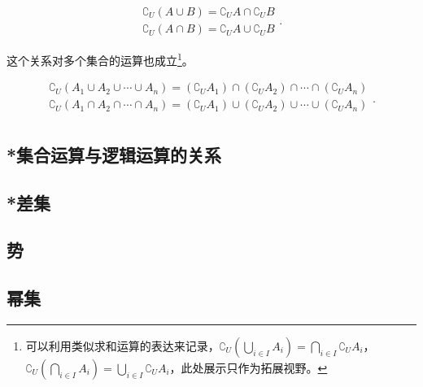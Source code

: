 \begin{equation}
\begin{array}{c} 
 \complement_U(A \cup B) = \complement_U A \cap \complement_U B \\  
\complement_U(A \cap B) = \complement_U A \cup \complement_U B
\end{array}.~
\end{equation}

这个关系对多个集合的运算也成立\footnote{可以利用类似求和运算的表达来记录，$\displaystyle\complement_U(\bigcup_{i\in I} A_i)=\bigcap_{i\in I} {\complement_UA_i}$，$\displaystyle\complement_U(\bigcap_{i\in I} A_i)=\bigcup_{i\in I} {\complement_UA_i}$，此处展示只作为拓展视野。}。

\begin{equation}
\begin{array}{c} 
\displaystyle
\complement_U(A_1\cup A_2\cup\cdots\cup A_n)=(\complement_UA_1)\cap (\complement_UA_2)\cap\cdots\cap(\complement_UA_n)\\  
\displaystyle
\complement_U(A_1\cap A_2\cap\cdots\cap A_n)=(\complement_UA_1)\cup (\complement_UA_2)\cup\cdots\cup(\complement_UA_n)\\  
\end{array}.~
\end{equation}


\subsection{*集合运算与逻辑运算的关系}



\subsection{*差集}
\subsection{势}
\subsection{幂集}
